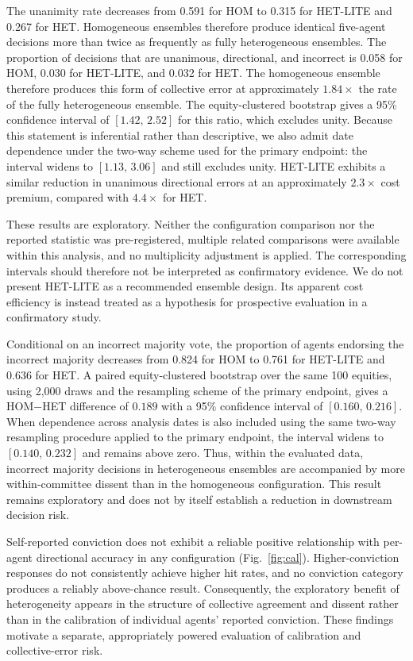 \documentclass{ieeeaccess}
\begin{document}
The unanimity rate decreases from 0.591 for HOM to 0.315 for HET-LITE and 0.267
for HET. Homogeneous ensembles therefore produce identical five-agent decisions
more than twice as frequently as fully heterogeneous ensembles. The proportion
of decisions that are unanimous, directional, and incorrect is 0.058 for HOM,
0.030 for HET-LITE, and 0.032 for HET. The homogeneous ensemble therefore
produces this form of collective error at approximately $1.84\times$ the rate of
the fully heterogeneous ensemble. The equity-clustered bootstrap gives a 95\%
confidence interval of $[1.42,\,2.52]$ for this ratio, which excludes unity.
Because this statement is inferential rather than descriptive, we also admit date
dependence under the two-way scheme used for the primary endpoint: the interval
widens to $[1.13,\,3.06]$ and still excludes unity.
HET-LITE exhibits a similar reduction in unanimous directional errors at an
approximately $2.3\times$ cost premium, compared with $4.4\times$ for HET.

These results are exploratory. Neither the configuration comparison nor the
reported statistic was pre-registered, multiple related comparisons were available
within this analysis, and no multiplicity adjustment is applied. The corresponding
intervals should therefore not be interpreted as confirmatory evidence. We do not
present HET-LITE as a recommended ensemble design. Its apparent cost efficiency is
instead treated as a hypothesis for prospective evaluation in a confirmatory
study.

Conditional on an incorrect majority vote, the proportion of agents endorsing
the incorrect majority decreases from 0.824 for HOM to 0.761 for HET-LITE and
0.636 for HET. A paired equity-clustered bootstrap over the same 100 equities,
using 2{,}000 draws and the resampling scheme of the primary endpoint, gives a
HOM$-$HET difference of $0.189$ with a 95\% confidence interval of
$[0.160,\,0.216]$. When dependence across analysis dates is also included using
the same two-way resampling procedure applied to the primary endpoint, the
interval widens to $[0.140,\,0.232]$ and remains above zero. Thus, within the
evaluated data, incorrect majority decisions in heterogeneous ensembles are
accompanied by more within-committee dissent than in the homogeneous
configuration. This result remains exploratory and does not by itself establish a
reduction in downstream decision risk.

Self-reported conviction does not exhibit a reliable positive relationship with
per-agent directional accuracy in any configuration (Fig.~\ref{fig:cal}).
Higher-conviction responses do not consistently achieve higher hit rates, and no
conviction category produces a reliably above-chance result. Consequently, the
exploratory benefit of heterogeneity appears in the structure of collective
agreement and dissent rather than in the calibration of individual agents'
reported conviction. These findings motivate a separate, appropriately powered
evaluation of calibration and collective-error risk.
\end{document}
